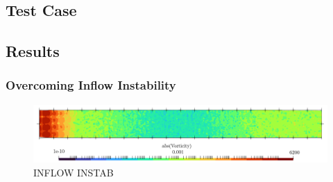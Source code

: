 \subsection{Test Case}




\subsection{Results}

\subsubsection{Overcoming Inflow Instability}


\begin{figure}[t]
\centering
\includegraphics[scale=0.36]{assets/graphs/u-inflow-instab.png}
\caption{INFLOW INSTAB}
\label{fig:inflow-instab}
\end{figure}


